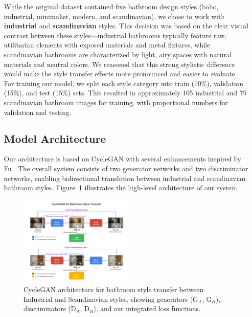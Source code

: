 \documentclass[twocolumn,superscriptaddress,aps]{revtex4-1}
\begin{document}
While the original dataset contained five bathroom design styles (boho, industrial, minimalist, modern, and scandinavian), we chose to work with \textbf{industrial} and \textbf{scandinavian} styles. This decision was based on the clear visual contrast between these styles—industrial bathrooms typically feature raw, utilitarian elements with exposed materials and metal fixtures, while scandinavian bathrooms are characterized by light, airy spaces with natural materials and neutral colors. We reasoned that this strong stylistic difference would make the style transfer effects more pronounced and easier to evaluate.\\

For training our model, we split each style category into train (70\%), validation (15\%), and test (15\%) sets. This resulted in approximately 105 industrial and 79 scandinavian bathroom images for training, with proportional numbers for validation and testing.

\subsection{Model Architecture}

Our architecture is based on CycleGAN \cite{zhu2017unpaired} with several enhancements inspired by Fu \cite{fu2022digital}. The overall system consists of two generator networks and two discriminator networks, enabling bidirectional translation between industrial and scandinavian bathroom styles. Figure~\ref{fig:architecture} illustrates the high-level architecture of our system.

\begin{figure}[htbp]
    \centering
    \includegraphics[width=0.5\textwidth]{assets/cyclegan_architecture.png}
    \caption{CycleGAN architecture for bathroom style transfer between Industrial and Scandinavian styles, showing generators (G$_A$, G$_B$), discriminators (D$_A$, D$_B$), and our integrated loss functions.}
    \label{fig:architecture}
\end{figure}
\end{document}

